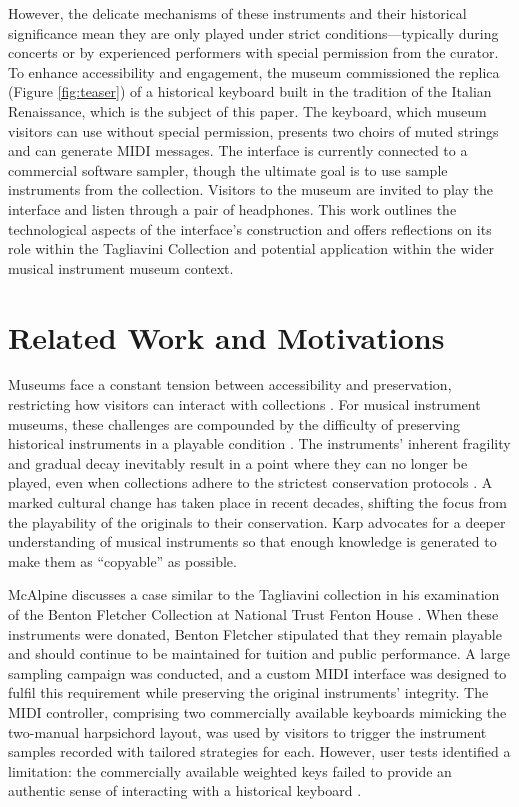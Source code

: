However, the delicate mechanisms of these instruments and their historical significance mean they are only played under strict conditions—typically during concerts or by experienced performers with special permission from the curator. 
To enhance accessibility and engagement, the museum commissioned the replica (Figure \ref{fig:teaser}) of a historical keyboard built in the tradition of the Italian Renaissance, which is the subject of this paper.
The keyboard, which museum visitors can use without special permission, presents two choirs of muted strings and can generate MIDI messages. The interface is currently connected to a commercial software sampler, though the ultimate goal is to use sample instruments from the collection. Visitors to the museum are invited to play the interface and listen through a pair of headphones. This work outlines the technological aspects of the interface's construction and offers reflections on its role within the Tagliavini Collection and potential application within the wider musical instrument museum context. 


\section{Related Work and Motivations}\label{related-work}


Museums face a constant tension between accessibility and preservation, restricting how visitors can interact with collections \cite{Templeton2018, McAlpine2014}. For musical instrument museums, these challenges are compounded by the difficulty of preserving historical instruments in a playable condition \cite{McAlpine2014}. The instruments' inherent fragility and gradual decay inevitably result in a point where they can no longer be played, even when collections adhere to the strictest conservation protocols \cite{NYT_strad}. A marked cultural change has taken place in recent decades, shifting the focus from the playability of the originals to their conservation. Karp \cite{Karp1979,Karp1985} advocates for a deeper understanding of musical instruments so that enough knowledge is generated to make them as ``copyable'' as possible.

McAlpine discusses a case similar to the Tagliavini collection in his examination of the Benton Fletcher Collection at National Trust Fenton House \cite{McAlpine2014}. When these instruments were donated, Benton Fletcher stipulated that they remain playable and should continue to be maintained for tuition and public performance. A large sampling campaign was conducted, and a custom MIDI interface was designed to fulfil this requirement while preserving the original instruments' integrity. The MIDI controller, comprising two commercially available keyboards mimicking the two-manual harpsichord layout, was used by visitors to trigger the instrument samples recorded with tailored strategies for each. However, user tests identified a limitation: the commercially available weighted keys failed to provide an authentic sense of interacting with a historical keyboard \cite{McAlpine2014}. 


